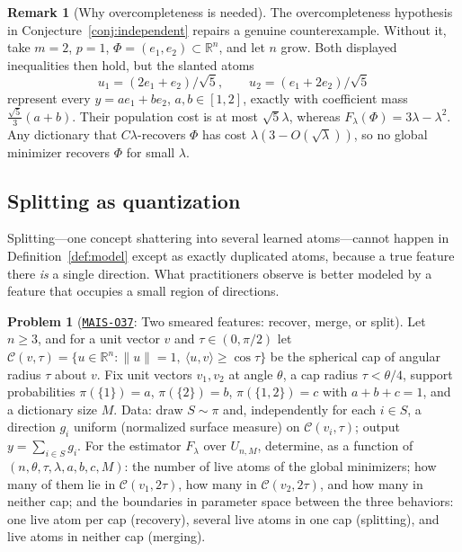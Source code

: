 \documentclass[11pt]{amsart}
\newcommand{\Oid}[1]{\href{https://github.com/lionellevine/MAIS/blob/main/open-problems/MAIS-O#1.md}{\texttt{MAIS-O#1}}}
\theoremstyle{plain}
\theoremstyle{definition}
\newtheorem{problem}[theorem]{Problem}
\newtheorem{remark}[theorem]{Remark}
\newcommand{\R}{\mathbb{R}}
\begin{document}
\begin{remark}[Why overcompleteness is needed]
The overcompleteness hypothesis in Conjecture~\ref{conj:independent} repairs a genuine counterexample. Without it, take $m=2$, $p=1$, $\Phi=(e_1,e_2)\subset\R^n$, and let $n$ grow. Both displayed inequalities then hold, but the slanted atoms
\[
u_1=(2e_1+e_2)/\sqrt5,\qquad u_2=(e_1+2e_2)/\sqrt5
\]
represent every $y=ae_1+be_2$, $a,b\in[1,2]$, exactly with coefficient mass $\frac{\sqrt5}{3}(a+b)$. Their population cost is at most $\sqrt5\lambda$, whereas $F_\lambda(\Phi)=3\lambda-\lambda^2$. Any dictionary that $C\lambda$-recovers $\Phi$ has cost $\lambda(3-O(\sqrt\lambda))$, so no global minimizer recovers $\Phi$ for small $\lambda$.
\end{remark}

\subsection{Splitting as quantization}

Splitting---one concept shattering into several learned atoms---cannot happen in Definition~\ref{def:model} except as exactly duplicated atoms, because a true feature there \emph{is} a single direction. What practitioners observe \cite{bricken2023,chanin2024,leask2025} is better modeled by a feature that occupies a small region of directions.

\begin{problem}[\Oid{37}: Two smeared features: recover, merge, or split]\label{prob:split}
Let $n\ge3$, and for a unit vector $v$ and $\tau\in(0,\pi/2)$ let $\mathcal C(v,\tau)=\{u\in\R^n:\lVert u\rVert=1,\ \langle u,v\rangle\ge\cos\tau\}$ be the spherical cap of angular radius $\tau$ about $v$. Fix unit vectors $v_1,v_2$ at angle $\theta$, a cap radius $\tau<\theta/4$, support probabilities $\pi(\{1\})=a$, $\pi(\{2\})=b$, $\pi(\{1,2\})=c$ with $a+b+c=1$, and a dictionary size $M$. Data: draw $S\sim\pi$ and, independently for each $i\in S$, a direction $g_i$ uniform (normalized surface measure) on $\mathcal C(v_i,\tau)$; output $y=\sum_{i\in S}g_i$. For the estimator $F_\lambda$ over $U_{n,M}$, determine, as a function of $(n,\theta,\tau,\lambda,a,b,c,M)$: the number of live atoms of the global minimizers; how many of them lie in $\mathcal C(v_1,2\tau)$, how many in $\mathcal C(v_2,2\tau)$, and how many in neither cap; and the boundaries in parameter space between the three behaviors: one live atom per cap (recovery), several live atoms in one cap (splitting), and live atoms in neither cap (merging).
\end{problem}
\end{document}
